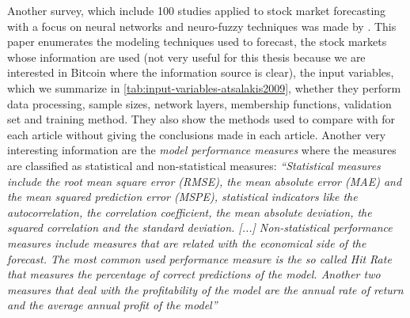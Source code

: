 Another survey, which include 100 studies applied to stock market
forecasting with a focus on neural networks and neuro-fuzzy techniques
was made by \cite{atsalakis2009surveying}. This paper enumerates the
modeling techniques used to forecast, the stock markets whose
information are used (not very useful for this thesis because we are
interested in Bitcoin where the information source is clear), the
input variables, which we summarize in
\autoref{tab:input-variables-atsalakis2009}, whether they perform data
processing, sample sizes, network layers, membership functions,
validation set and training method. They also show the methods used to
compare with for each article without giving the conclusions made in
each article. Another very interesting information are the
\textit{model performance measures} where the measures are classified
as statistical and non-statistical measures: \textit{``Statistical
  measures include the root mean square error (RMSE), the mean
  absolute error (MAE) and the mean squared prediction error (MSPE),
  statistical indicators like the autocorrelation, the correlation
  coefficient, the mean absolute deviation, the squared correlation
  and the standard deviation. [...] Non-statistical performance
  measures include measures that are related with the economical side
  of the forecast. The most common used performance measure is the so
  called Hit Rate that measures the percentage of correct predictions
  of the model. Another two measures that deal with the profitability
  of the model are the annual rate of return and the average annual
  profit of the model''}

